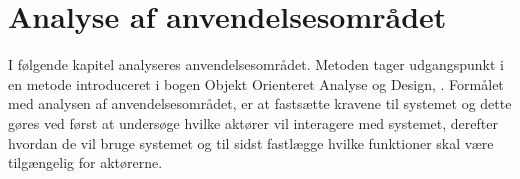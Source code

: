 \chapter{Analyse af anvendelsesområdet}
\label{chap:analyseafao}

I følgende kapitel analyseres anvendelsesområdet. Metoden tager udgangspunkt i en metode introduceret i bogen Objekt Orienteret Analyse og Design, \cite[p. ~113]{ooad}. Formålet med analysen af anvendelsesområdet, er at fastsætte kravene til \Foodl systemet og dette gøres ved først at undersøge hvilke aktører vil interagere med systemet, derefter hvordan de vil bruge systemet og til sidst fastlægge hvilke funktioner skal være tilgængelig for aktørerne.




